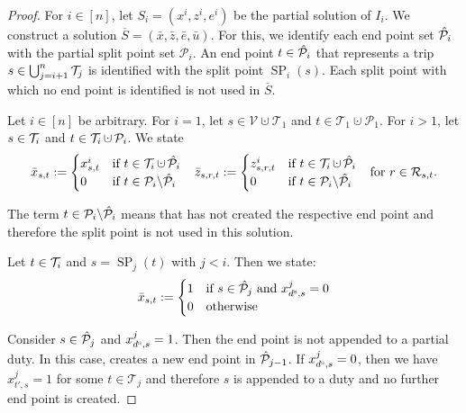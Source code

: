 \begin{proof}

For ${i\in[n]}$, let ${S_i=\left(x^i,z^i,e^i\right)}$ be the partial solution of $I_i$. We construct a solution ${\overline{S}=\left(\bar{x},\bar{z},\bar{e},\bar{u}\right)}$. For this, we identify each end point set $\hat{\mathcal{P}}_i$ with the partial split point set $\mathcal{P}_i$. An end point ${t\in\hat{\mathcal{P}}_i}$ that represents a trip ${s\in\bigcup_{j=i+1}^n \mathcal{T}_j}$ is identified with the split point $\operatorname{SP}_i(s)$. Each split point with which no end point is identified is not used in $\overline{S}$.

Let ${i\in[n]}$ be arbitrary. For ${i=1}$, let ${s\in\mathcal{V}\cupdot\mathcal{T}_1}$ and ${t\in\mathcal{T}_1\cupdot\mathcal{P}_1}$. For ${i>1}$, let ${s\in\mathcal{T}_i}$ and ${t\in\Ti\cupdot\mathcal{P}_i}$. We state
\begin{align*}
	\bar{x}_{s,t} := \begin{cases} x^i_{s,t} & \text{if } t\in\Ti\cupdot\Phat_i \\ 0 & \text{if } t\in\mathcal{P}_i\backslash\Phat_i \end{cases} &&
	\bar{z}_{s,r,t} := \begin{cases} z^i_{s,r,t} & \text{if } t\in\Ti\cupdot\Phat_i \\ 0 & \text{if } t\in\mathcal{P}_i\backslash\Phat_i \end{cases} &&
	\text{for } r\in\Rst.
\end{align*}

The term ${t\in\mathcal{P}_i\backslash\hat{\mathcal{P}}_i}$ means that  has not created the respective end point and therefore the split point is not used in this solution.

Let ${t\in\mathcal{T}_i}$ and ${s=\operatorname{SP}_j(t)}$ with ${j<i}$. Then we state:
\begin{align*}
	\bar{x}_{s,t} := \begin{cases} 1 & \text{if } s\in\hat{\mathcal{P}}_j \text{ and } x^j_{d^{\operatorname{s}},s} = 0 \\ 0 & \text{otherwise} \end{cases}
\end{align*}

Consider ${s\in\hat{\mathcal{P}}_j}$ and ${x^j_{d^{\operatorname{s}},s}=1}$. Then the end point is not appended to a partial duty. In this case,  creates a new end point in $\hat{\mathcal{P}}_{j-1}$. If ${x^j_{d^{\operatorname{s}},s}=0}$, then we have ${x^j_{t',s}=1}$ for some ${t\in\mathcal{T}_j}$ and therefore $s$ is appended to a duty and no further end point is created.


\end{proof}
